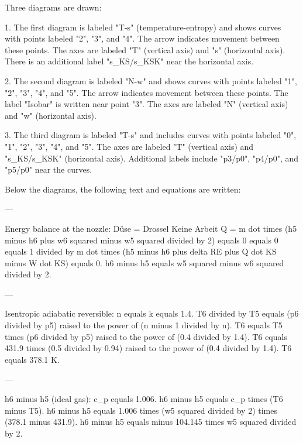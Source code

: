 Three diagrams are drawn:

1. The first diagram is labeled "T-s" (temperature-entropy) and shows curves with points labeled "2", "3", and "4". The arrow indicates movement between these points. The axes are labeled "T" (vertical axis) and "s" (horizontal axis). There is an additional label "s_KS/s_KSK" near the horizontal axis.

2. The second diagram is labeled "N-w" and shows curves with points labeled "1", "2", "3", "4", and "5". The arrow indicates movement between these points. The label "Isobar" is written near point "3". The axes are labeled "N" (vertical axis) and "w" (horizontal axis).

3. The third diagram is labeled "T-s" and includes curves with points labeled "0", "1", "2", "3", "4", and "5". The axes are labeled "T" (vertical axis) and "s_KS/s_KSK" (horizontal axis). Additional labels include "p3/p0", "p4/p0", and "p5/p0" near the curves.

Below the diagrams, the following text and equations are written:

---

Energy balance at the nozzle:  
Düse = Drossel Keine Arbeit  
Q = m dot times (h5 minus h6 plus w6 squared minus w5 squared divided by 2) equals 0 equals 0 equals 1 divided by m dot times (h5 minus h6 plus delta RE plus Q dot KS minus W dot KS) equals 0.  
h6 minus h5 equals w5 squared minus w6 squared divided by 2.

---

Isentropic adiabatic reversible:  
n equals k equals 1.4.  
T6 divided by T5 equals (p6 divided by p5) raised to the power of (n minus 1 divided by n).  
T6 equals T5 times (p6 divided by p5) raised to the power of (0.4 divided by 1.4).  
T6 equals 431.9 times (0.5 divided by 0.94) raised to the power of (0.4 divided by 1.4).  
T6 equals 378.1 K.

---

h6 minus h5 (ideal gas):  
c_p equals 1.006.  
h6 minus h5 equals c_p times (T6 minus T5).  
h6 minus h5 equals 1.006 times (w5 squared divided by 2) times (378.1 minus 431.9).  
h6 minus h5 equals minus 104.145 times w5 squared divided by 2.